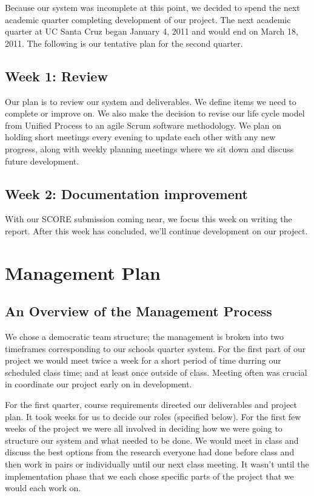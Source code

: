 \documentclass[12pt]{article}
\begin{document}
Because our system was incomplete at this point, we decided to spend the next academic quarter completing development of our project. The next academic quarter at UC Santa Cruz began January 4, 2011 and would end on March 18, 2011. The following is our tentative plan for the second quarter. 

\subsection*{Week 1: Review}

Our plan is to review our system and deliverables. We define items we need to complete or improve on. We also make the decision to revise our life cycle model from Unified Process to an agile Scrum software methodology. We plan on holding short meetings every evening to update each other with any new progress, along with weekly planning meetings where we sit down and discuss future development. 

\subsection*{Week 2: Documentation improvement}

With our SCORE submission coming near, we focus this week on writing the report. After this week has concluded, we'll continue development on our project.

\section{Management Plan} %

\subsection{An Overview of the Management Process}
We chose a democratic team structure; the management is broken into two timeframes corresponding to our schools quarter system. For the first part of our project we would meet twice a week for a short period of time durring our scheduled class time; and at least once outside of class. Meeting often was crucial in coordinate our project early on in development.

For the first quarter, course requirements directed our deliverables and project plan. It took weeks for us to decide our roles (specified below). For the first few weeks of the project we were all involved in deciding how we were going to structure our system and what needed to be done. We would meet in class and discuss the best options from the research everyone had done before class and then work in pairs or individually until our next class meeting. It wasn't until the implementation phase that we each chose specific parts of the project that we would each work on. 
 
\end{document}
